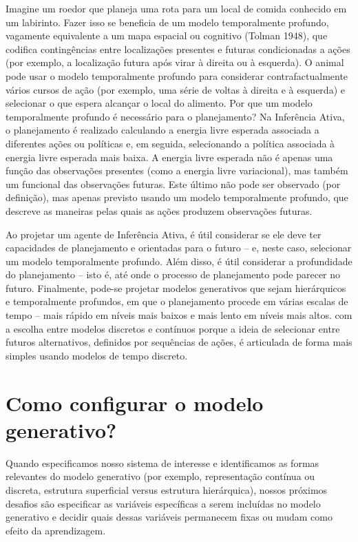 \documentclass[
  12pt,
]{book}
\begin{document}
Imagine um roedor que planeja uma rota para um local de comida conhecido em um labirinto. Fazer isso se beneficia de um modelo temporalmente profundo, vagamente equivalente a um mapa espacial ou cognitivo (Tolman 1948), que codifica contingências entre localizações presentes e futuras condicionadas a ações (por exemplo, a localização futura após virar à direita ou à esquerda). O animal pode usar o modelo temporalmente profundo para considerar contrafactualmente vários cursos de ação (por exemplo, uma série de voltas à direita e à esquerda) e selecionar o que espera alcançar o local do alimento. Por que um modelo temporalmente profundo é necessário para o planejamento? Na Inferência Ativa, o planejamento é realizado calculando a energia livre esperada associada a diferentes ações ou políticas e, em seguida, selecionando a política associada à energia livre esperada mais baixa. A energia livre esperada não é apenas uma função das observações presentes (como a energia livre variacional), mas também um funcional das observações futuras. Este último não pode ser observado (por definição), mas apenas previsto usando um modelo temporalmente profundo, que descreve as maneiras pelas quais as ações produzem observações futuras.

Ao projetar um agente de Inferência Ativa, é útil considerar se ele deve ter capacidades de planejamento e orientadas para o futuro -- e, neste caso, selecionar um modelo temporalmente profundo. Além disso, é útil considerar a profundidade do planejamento -- isto é, até onde o processo de planejamento pode parecer no futuro. Finalmente, pode-se projetar modelos generativos que sejam hierárquicos e temporalmente profundos, em que o planejamento procede em várias escalas de tempo -- mais rápido em níveis mais baixos e mais lento em níveis mais altos. com a escolha entre modelos discretos e contínuos porque a ideia de selecionar entre futuros alternativos, definidos por sequências de ações, é articulada de forma mais simples usando modelos de tempo discreto.

\hypertarget{como-configurar-o-modelo-generativo}{%
\section{Como configurar o modelo generativo?}\label{como-configurar-o-modelo-generativo}}

Quando especificamos nosso sistema de interesse e identificamos as formas relevantes do modelo generativo (por exemplo, representação contínua ou discreta, estrutura superficial versus estrutura hierárquica), nossos próximos desafios são especificar as variáveis específicas a serem incluídas no modelo generativo e decidir quais dessas variáveis permanecem fixas ou mudam como efeito da aprendizagem.
\end{document}
